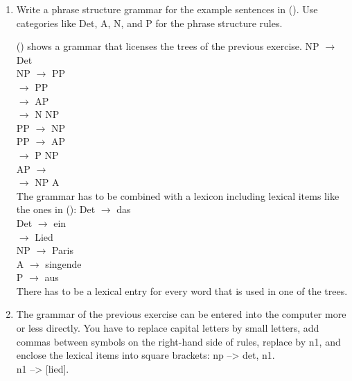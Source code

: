 \begin{enumerate}
\begin{figure}
\caption{Analysis of \emph{das ein Lied singende Kind aus dem Allgäu} `the child from the Allgäu
  singing a song'}
\end{figure}

\item Write a phrase structure grammar for the example sentences in (). Use categories like
  Det, A, N, and P for the phrase structure rules.

() shows a grammar that licenses the trees of the previous exercise. 
\ea
NP $\to$ Det \nbar\\
NP $\to$ \nbar PP\\
\nbar $\to$ \nbar PP\\
\nbar $\to$ AP \nbar\\
\nbar $\to$ N NP\\
%
PP $\to$ NP \pbar\\
PP $\to$ AP \pbar\\
\pbar $\to$ P NP\\
%
AP $\to$ \abar\\
\abar $\to$ NP A\\
%
\z
The grammar has to be combined with a lexicon including lexical items like the ones in ():
\ea
Det $\to$ das\\
Det $\to$ ein\\
\nbar $\to$ Lied\\
NP $\to$ Paris\\
A $\to$ singende\\
P $\to$ aus\\
\z
There has to be a lexical entry for every word that is used in one of the trees.
\item The grammar of the previous exercise can be entered into the computer more or less
  directly. You have to replace capital letters by small letters, add commas between symbols on the
  right-hand side of rules, replace \nbar by n1, and enclose the lexical items into square brackets:
\ea
np --> det, n1.\\
n1 --> [lied].\\
\z
\end{enumerate}
\clearpage

